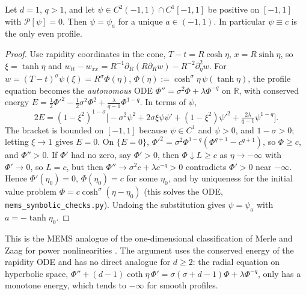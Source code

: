 \begin{theorem}[Classification in $d=1$]\label{mems:thm-d1}
Let $d=1$, $q>1$, and let $\psi\in C^2(-1,1)\cap C^1[-1,1]$ be positive on
$[-1,1]$ with $\mathcal P[\psi]=0$. Then $\psi=\psi_a$ for a unique
$a\in(-1,1)$. In particular $\psi\equiv c$ is the only even profile.
\end{theorem}

\begin{proof}
Use rapidity coordinates in the cone, $T-t=R\cosh\eta$, $x=R\sinh\eta$, so
$\xi=\tanh\eta$ and $w_{tt}-w_{xx}=R^{-1}\partial_R(R\partial_Rw)-R^{-2}\partial_\eta^2w$.
For $w=(T-t)^\sigma\psi(\xi)=R^\sigma\Phi(\eta)$, $\Phi(\eta):=\cosh^\sigma\!\eta\,\psi(\tanh\eta)$,
the profile equation becomes the \emph{autonomous} ODE
$\Phi''=\sigma^2\Phi+\lambda\Phi^{-q}$ on $\mathbb R$, with conserved energy
$E=\frac12\Phi'^2-\frac12\sigma^2\Phi^2+\frac{\lambda}{q-1}\Phi^{1-q}$. In terms of
$\psi$,
\[
  2E=(1-\xi^2)^{1-\sigma}\Big[-\sigma^2\psi^2+2\sigma\xi\psi\psi'+(1-\xi^2)\psi'^2+\tfrac{2\lambda}{q-1}\psi^{1-q}\Big].
\]
The bracket is bounded on $[-1,1]$ because $\psi\in C^1$ and $\psi>0$, and
$1-\sigma>0$; letting $\xi\to1$ gives $E=0$. On $\{E=0\}$,
$\Phi'^2=\sigma^2\Phi^{1-q}(\Phi^{q+1}-c^{q+1})$, so $\Phi\ge c$, and
$\Phi''>0$. If $\Phi'$ had no zero, say $\Phi'>0$, then $\Phi\downarrow L\ge c$
as $\eta\to-\infty$ with $\Phi'\to0$, so $L=c$, but then
$\Phi''\to\sigma^2c+\lambda c^{-q}>0$ contradicts $\Phi'>0$ near $-\infty$.
Hence $\Phi'(\eta_0)=0$, $\Phi(\eta_0)=c$ for some $\eta_0$, and by uniqueness for
the initial value problem $\Phi=c\cosh^\sigma(\eta-\eta_0)$ (this solves the ODE,
\texttt{mems\_symbolic\_checks.py}). Undoing the substitution gives
$\psi=\psi_a$ with $a=-\tanh\eta_0$.
\end{proof}

This is the MEMS analogue of the one-dimensional classification of
Merle and Zaag for power nonlinearities \cite{MerleZaag2007}. The argument
uses the conserved energy of the rapidity ODE and has no direct analogue for
$d\ge2$: the radial equation on hyperbolic space,
$\Phi''+(d-1)\coth\eta\,\Phi'=\sigma(\sigma+d-1)\Phi+\lambda\Phi^{-q}$, only has a
monotone energy, which tends to $-\infty$ for smooth profiles.

